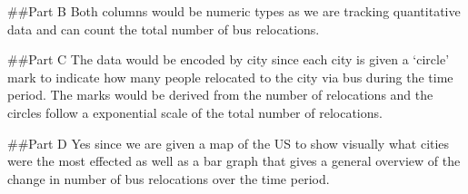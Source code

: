 \documentclass[
]{article}
\begin{document}
\#\#Part B Both columns would be numeric types as we are tracking
quantitative data and can count the total number of bus relocations.

\#\#Part C The data would be encoded by city since each city is given a
`circle' mark to indicate how many people relocated to the city via bus
during the time period. The marks would be derived from the number of
relocations and the circles follow a exponential scale of the total
number of relocations.

\#\#Part D Yes since we are given a map of the US to show visually what
cities were the most effected as well as a bar graph that gives a
general overview of the change in number of bus relocations over the
time period.
\end{document}
